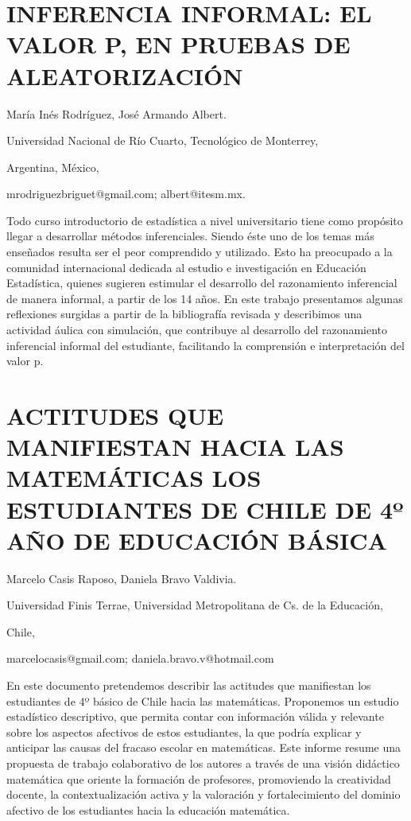 \setcounter{section}{230}


\section{INFERENCIA INFORMAL: EL VALOR P, EN PRUEBAS DE ALEATORIZACIÓN }

\begin{datos}

María Inés Rodríguez, José Armando Albert.

Universidad Nacional de Río Cuarto, Tecnológico de Monterrey,

Argentina, México,

mrodriguezbriguet@gmail.com; albert@itesm.mx.

\end{datos}

Todo curso introductorio de estadística a nivel universitario tiene
como propósito llegar a desarrollar métodos inferenciales. Siendo
éste uno de los temas más enseñados resulta ser el peor comprendido
y utilizado. Esto ha preocupado a la comunidad internacional dedicada
al estudio e investigación en Educación Estadística, quienes sugieren
estimular el desarrollo del razonamiento inferencial de manera informal,
a partir de los 14 años. En este trabajo presentamos algunas reflexiones
surgidas a partir de la bibliografía revisada y describimos una actividad
áulica con simulación, que contribuye al desarrollo del razonamiento
inferencial informal del estudiante, facilitando la comprensión e
interpretación del valor p.


\section{ACTITUDES QUE MANIFIESTAN HACIA LAS MATEMÁTICAS LOS ESTUDIANTES DE
CHILE DE 4º AÑO DE EDUCACIÓN BÁSICA }

\begin{datos}

Marcelo Casis Raposo, Daniela Bravo Valdivia.

Universidad Finis Terrae, Universidad Metropolitana de Cs. de la Educación, 

Chile,

marcelocasis@gmail.com; daniela.bravo.v@hotmail.com

\end{datos}

En este documento pretendemos describir las actitudes que manifiestan
los estudiantes de 4º básico de Chile hacia las matemáticas. Proponemos
un estudio estadístico descriptivo, que permita contar con información
válida y relevante sobre los aspectos afectivos de estos estudiantes,
la que podría explicar y anticipar las causas del fracaso escolar
en matemáticas. Este informe resume una propuesta de trabajo colaborativo
de los autores a través de una visión didáctico matemática que oriente
la formación de profesores, promoviendo la creatividad docente, la
contextualización activa y la valoración y fortalecimiento del dominio
afectivo de los estudiantes hacia la educación matemática.


